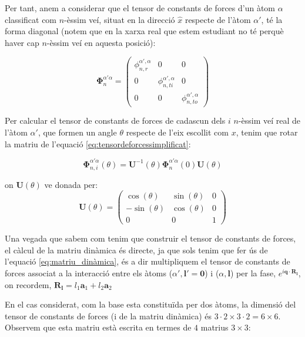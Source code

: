 \documentclass[12pt]{article} %
\let\vec\mathbf %
\begin{document}
Per tant, anem a considerar que el tensor de constants de forces  d'un àtom $\alpha$ classificat com $n$-èssim veí, situat en la direcció $\hat x$ respecte de l'àtom  $\alpha'$, té la forma diagonal (notem que en la xarxa real que estem estudiant no té perquè haver cap $n$-èssim veí en aquesta posició):

\begin{equation}
\vec\Phi_n^{\alpha'\alpha}=\begin{pmatrix}
\phi_{n,r}^{\alpha',\alpha}&0 &0\\
0& \phi_{n,ti}^{\alpha',\alpha} & 0 \\
0 & 0 & \phi_{n,to}^{\alpha',\alpha}
\end{pmatrix}
\label{eq:tensordeforcessimplificat}
\end{equation}

Per calcular el tensor de constants de forces de cadascun dels $i$ $n$-èssim veí real de l'àtom $\alpha'$, que formen un angle $\theta$ respecte de l'eix escollit com $x$, tenim que rotar la matriu de l'equació \ref{eq:tensordeforcessimplificat}:

\begin{equation}
 \vec\Phi_{n,i}^{\alpha'\alpha}(\theta)=\vec U^{-1}(\theta)\vec\Phi_n^{\alpha'\alpha}(0)\vec U(\theta)
\end{equation}


on $\vec U(\theta)$ ve donada per:
\begin{equation}
\vec U(\theta)=
\begin{pmatrix}
\cos(\theta)  & \sin(\theta) & 0 \\
-\sin(\theta) & \cos(\theta) & 0  \\
0             & 0            & 1
\end{pmatrix}
\end{equation}


Una vegada que sabem com tenim que construir el tensor de constants de forces, el càlcul de la matriu dinàmica és directe, ja que sols tenim que fer ús de l'equació \ref{eq:matriu_dinàmica}, és a dir multipliquem el tensor de constants de forces associat a la interacció entre els àtoms ($\alpha', \vec l'=\vec 0$) i ($\alpha,\vec l$) per la fase, $e^{i \vec q\cdot \vec R_\vec l}$, on recordem, $\vec R_\vec l=l_1 \vec a_1+ l_2 \vec a_2$

En el cas considerat, com la base esta constituïda per dos àtoms, la dimensió del tensor de constants de forces (i de la matriu dinàmica) és $3\cdot 2\times 3\cdot 2= 6\times 6$. Observem que esta matriu està escrita en termes de $4$ matrius $3\times 3$:
\end{document}
